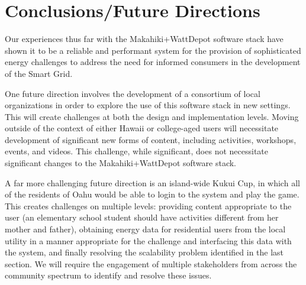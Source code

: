 \section{Conclusions/Future Directions}

Our experiences thus far with the Makahiki+WattDepot software stack have shown it to be a
reliable and performant system for the provision of sophisticated energy challenges to
address the need for informed consumers in the development of the Smart Grid.

One future direction involves the development of a consortium of local organizations in
order to explore the use of this software stack in new settings.  This will create
challenges at both the design and implementation levels.   Moving outside of the context
of either Hawaii or college-aged users will necessitate development of significant new
forms of content, including activities, workshops, events, and videos. This challenge,
while significant, does not necessitate significant changes to the Makahiki+WattDepot
software stack.

A far more challenging future direction is an island-wide Kukui Cup, in which all of the residents of
Oahu would be able to login to the system and play the game. This creates challenges on
multiple levels: providing content appropriate to the user (an elementary school student should
have activities different from her mother and father), obtaining energy data for
residential users from the local utility in a manner appropriate for the challenge and
interfacing this data with the system, and finally resolving the scalability problem
identified in the last section.  We will require the engagement of multiple stakeholders
from across the community spectrum to identify and resolve these issues. 
